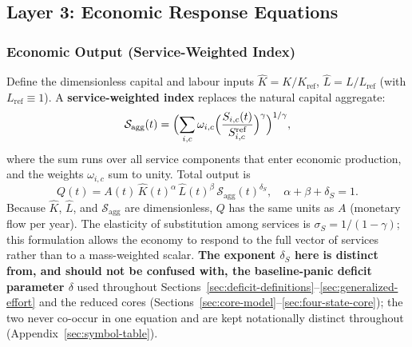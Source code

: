 \documentclass[twocolumn,10pt]{article}
\begin{document}
\subsection{Layer 3: Economic Response Equations}
\subsubsection{Economic Output (Service-Weighted Index)}
Define the dimensionless capital and labour inputs \(\hat{K} = K/K_{\text{ref}}\), \(\hat{L} = L/L_{\text{ref}}\) (with \(L_{\text{ref}} \equiv 1\)). A \textbf{service-weighted index} replaces the natural capital aggregate:
\[
\mathcal{S}_{\text{agg}}(t) = \Bigl( \sum_{i,c} \omega_{i,c}
\Bigl( \frac{S_{i,c}(t)}{S_{i,c}^{\text{ref}}} \Bigr)^{\gamma} \Bigr)^{1/\gamma},
\]
where the sum runs over all service components that enter economic production, and the weights \(\omega_{i,c}\) sum to unity. Total output is
\[
Q(t) = A(t)\, \hat{K}(t)^\alpha \, \hat{L}(t)^\beta \, \mathcal{S}_{\text{agg}}(t)^{\delta_S}, \quad
\alpha+\beta+\delta_S=1.
\]
Because \(\hat{K}\), \(\hat{L}\), and \(\mathcal{S}_{\text{agg}}\) are dimensionless, \(Q\) has the same units as \(A\) (monetary flow per year). The elasticity of substitution among services is \(\sigma_S = 1/(1-\gamma)\); this formulation allows the economy to respond to the full vector of services rather than to a mass-weighted scalar. \textbf{The exponent $\delta_S$ here is distinct from, and should not be confused with, the baseline-panic deficit parameter $\delta$} used throughout Sections~\ref{sec:deficit-definitions}--\ref{sec:generalized-effort} and the reduced cores (Sections~\ref{sec:core-model}--\ref{sec:four-state-core}); the two never co-occur in one equation and are kept notationally distinct throughout (Appendix~\ref{sec:symbol-table}).
\end{document}

